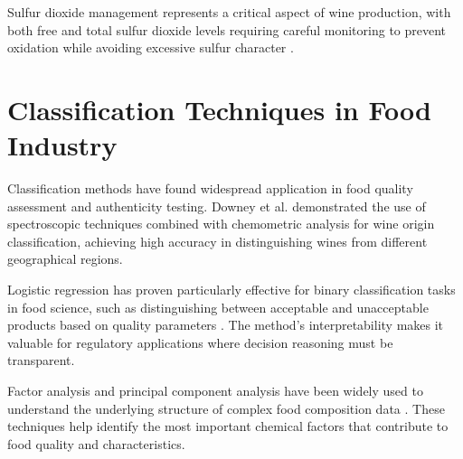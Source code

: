 Sulfur dioxide management represents a critical aspect of wine production, with both free and total sulfur dioxide levels requiring careful monitoring to prevent oxidation while avoiding excessive sulfur character \cite{waterhouse2016}.

\section{Classification Techniques in Food Industry}

Classification methods have found widespread application in food quality assessment and authenticity testing. Downey et al. \cite{downey2006} demonstrated the use of spectroscopic techniques combined with chemometric analysis for wine origin classification, achieving high accuracy in distinguishing wines from different geographical regions.

Logistic regression has proven particularly effective for binary classification tasks in food science, such as distinguishing between acceptable and unacceptable products based on quality parameters \cite{granato2018}. The method's interpretability makes it valuable for regulatory applications where decision reasoning must be transparent.

Factor analysis and principal component analysis have been widely used to understand the underlying structure of complex food composition data \cite{jolliffe2016}. These techniques help identify the most important chemical factors that contribute to food quality and characteristics.